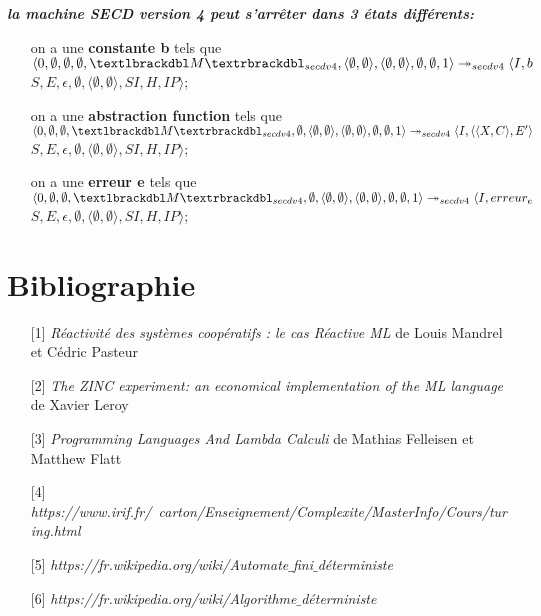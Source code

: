 \documentclass[10pt,a4paper]{article}
\begin{document}
					
				\textbf{\textit{la machine SECD version 4 peut s'arrêter dans 3 états différents:}}
				\smallbreak
				\begin{itemize}
					\item[] on a une \textbf{constante b} tels que $\langle 0,\emptyset,\emptyset,\emptyset,\textlbrackdbl M\textrbrackdbl_{secdv4},\langle\emptyset,\emptyset\rangle,\langle\emptyset,\emptyset\rangle,\emptyset,\emptyset,1\rangle \\
					\twoheadrightarrow_{secdv4} \langle I,b$ $S,E,\epsilon,\emptyset,\langle\emptyset,\emptyset\rangle,SI,H,IP\rangle$;
					\item[] 
					\item[] on a une \textbf{abstraction function} tels que
					$\langle 0,\emptyset,\emptyset,\textlbrackdbl M\textrbrackdbl_{secdv4},\emptyset,\langle\emptyset,\emptyset\rangle,\langle\emptyset,\emptyset\rangle,\emptyset,\emptyset,1\rangle \\
					\twoheadrightarrow_{secdv4} \langle I,\langle\langle X,C\rangle,E'\rangle$ $S,E,\epsilon,\emptyset,\langle\emptyset,\emptyset\rangle,SI,H,IP\rangle$;
					\item[] 
					\item[] on a une \textbf{erreur e} tels que 
					$\langle 0,\emptyset,\emptyset,\textlbrackdbl M\textrbrackdbl_{secdv4},\emptyset,\langle\emptyset,\emptyset\rangle,\langle\emptyset,\emptyset\rangle,\emptyset,\emptyset,1\rangle \\
					\twoheadrightarrow_{secdv4} \langle I,erreur_{e}$ $S,E,\epsilon,\emptyset,\langle\emptyset,\emptyset\rangle,SI,H,IP\rangle$;
				\end{itemize}
				\newpage
			
			
					
	\section{Bibliographie}
		\begin{itemize}
			\item[] [1] \textit{Réactivité des systèmes coopératifs : le cas Réactive ML} de Louis Mandrel et Cédric Pasteur\label{ReactiveML}
			\item[] [2] \textit{The ZINC experiment: an economical implementation of the ML language} de Xavier Leroy\label{ZINC}
			\item[] [3] \textit{Programming Languages And Lambda Calculi} de Mathias Felleisen et Matthew Flatt\label{Calculi}
			\item[] [4] \textit{https://www.irif.fr/~carton/Enseignement/Complexite/MasterInfo/Cours/turing.html}\label{Turing}
			\item[] [5] \textit{https://fr.wikipedia.org/wiki/Automate$\_$fini$\_$déterministe}\label{AFD}
			\item[] [6] \textit{https://fr.wikipedia.org/wiki/Algorithme$\_$déterministe}\label{MFD}
		\end{itemize}
		
		
\end{document}
